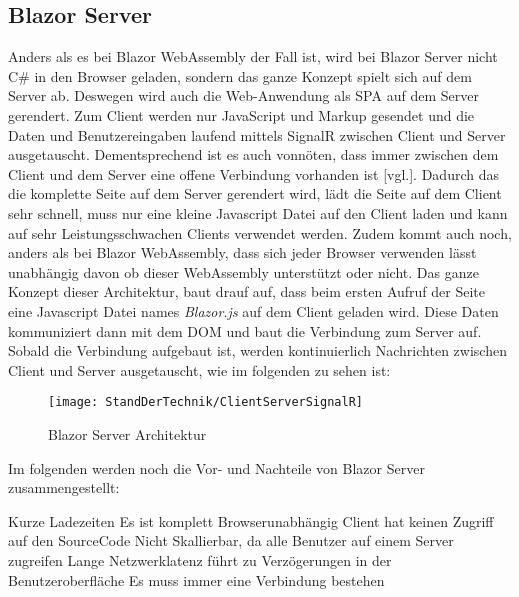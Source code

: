 \subsection{Blazor Server}
Anders als es bei Blazor WebAssembly der Fall ist, wird bei Blazor Server nicht C\# in den
Browser geladen, sondern das ganze Konzept spielt sich auf dem Server ab. Deswegen wird auch die
Web-Anwendung als SPA auf dem Server gerendert. Zum Client werden nur JavaScript und Markup
gesendet und die Daten und Benutzereingaben laufend mittels SignalR zwischen Client und Server
ausgetauscht. Dementsprechend ist es auch vonnöten, dass immer zwischen dem Client und dem Server
eine offene Verbindung vorhanden ist \cite{HierKommtBlazor}[vgl.].
\newline
\newline
Dadurch das die komplette Seite auf dem Server gerendert wird, lädt die Seite auf dem Client sehr
schnell, muss nur eine kleine Javascript Datei auf den Client laden und kann auf sehr
Leistungsschwachen Clients verwendet werden. Zudem kommt auch noch, anders als bei Blazor
WebAssembly, dass sich jeder Browser verwenden lässt unabhängig davon ob dieser WebAssembly
unterstützt oder nicht.
\newline
\newline
Das ganze Konzept dieser Architektur, baut drauf auf, dass beim ersten Aufruf der Seite eine
Javascript Datei names \emph{Blazor.js} auf dem Client geladen wird. Diese Daten kommuniziert dann mit
dem DOM und baut die Verbindung zum Server auf. Sobald die Verbindung aufgebaut ist, werden
kontinuierlich Nachrichten zwischen Client und Server ausgetauscht, wie im folgenden zu sehen ist:
\begin{figure}[h]
    \centering
    \texttt{[image: StandDerTechnik/ClientServerSignalR]}
    \caption[Blazor Server Architektur]{Blazor Server Architektur}
    \label{img:clientserversignalR}
\end{figure}

Im folgenden werden noch die Vor- und Nachteile von Blazor Server zusammengestellt:
\begin{itemize}
    \pro Kurze Ladezeiten
    \pro Es ist komplett Browserunabhängig
    \pro Client hat keinen Zugriff auf den SourceCode
    \con Nicht Skallierbar, da alle Benutzer auf einem Server zugreifen
    \con Lange Netzwerklatenz führt zu Verzögerungen in der Benutzeroberfläche
    \con Es muss immer eine Verbindung bestehen
\end{itemize}